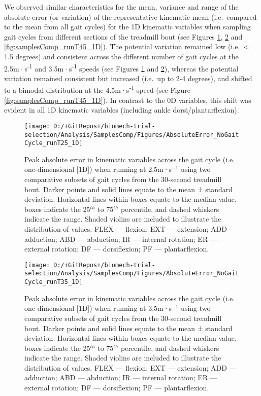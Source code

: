 \documentclass[]{elsarticle} %
\begin{document}
We observed similar characteristics for the mean, variance and range of
the absolute error (or variation) of the representative kinematic mean
(i.e.~compared to the mean from all gait cycles) for the 1D kinematic
variables when sampling gait cycles from different sections of the
treadmill bout (see Figures \ref{fig:samplesComp_runT25_1D},
\ref{fig:samplesComp_runT35_1D} and \ref{fig:samplesComp_runT45_1D}).
The potential variation remained low (i.e.~\textless{} 1.5 degrees) and
consistent across the different number of gait cycles at the
2.5m·s\textsuperscript{-1} and 3.5m·s\textsuperscript{-1} speeds (see
Figures \ref{fig:samplesComp_runT25_1D} and
\ref{fig:samplesComp_runT35_1D}), whereas the potential variation
remained consistent but increased (i.e.~up to 2-4 degrees), and shifted
to a bimodal distribution at the 4.5m·s\textsuperscript{-1} speed (see
Figure \ref{fig:samplesComp_runT45_1D}). In contrast to the 0D
variables, this shift was evident in all 1D kinematic variables
(including ankle dorsi/plantarflexion).

\begin{figure}

{\centering \texttt{[image: D:/+GitRepos+/biomech-trial-selection/Analysis/SamplesComp/Figures/AbsoluteError\_NoGaitCycle\_runT25\_1D]} 

}

\caption{Peak absolute error in kinematic variables across the gait cycle (i.e. one-dimensional [1D]) when running at 2.5m·s$^{-1}$ using two comparative subsets of gait cycles from the 30-second treadmill bout. Darker points and solid lines equate to the mean ± standard deviation. Horizontal lines within boxes equate to the median value, boxes indicate the 25$^{th}$ to 75$^{th}$ percentile, and dashed whiskers indicate the range. Shaded violins are included to illustrate the distribution of values. FLEX — flexion; EXT — extension; ADD — adduction; ABD — abduction; IR — internal rotation; ER — external rotation; DF — dorsiflexion; PF — plantarflexion.}\label{fig:samplesComp_runT25_1D}
\end{figure}

\begin{figure}

{\centering \texttt{[image: D:/+GitRepos+/biomech-trial-selection/Analysis/SamplesComp/Figures/AbsoluteError\_NoGaitCycle\_runT35\_1D]} 

}

\caption{Peak absolute error in kinematic variables across the gait cycle (i.e. one-dimensional [1D]) when running at 3.5m·s$^{-1}$ using two comparative subsets of gait cycles from the 30-second treadmill bout. Darker points and solid lines equate to the mean ± standard deviation. Horizontal lines within boxes equate to the median value, boxes indicate the 25$^{th}$ to 75$^{th}$ percentile, and dashed whiskers indicate the range. Shaded violins are included to illustrate the distribution of values. FLEX — flexion; EXT — extension; ADD — adduction; ABD — abduction; IR — internal rotation; ER — external rotation; DF — dorsiflexion; PF — plantarflexion.}\label{fig:samplesComp_runT35_1D}
\end{figure}
\end{document}

